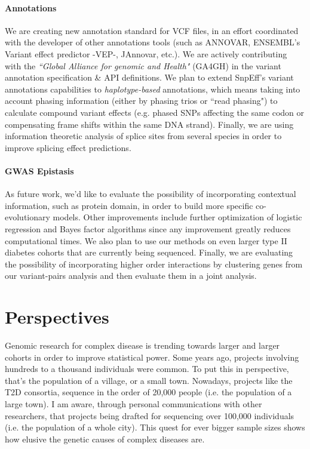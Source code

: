 \paragraph{Annotations}
We are creating new annotation standard for VCF files, in an effort coordinated with the developer of other annotations tools (such as ANNOVAR, ENSEMBL’s Variant effect predictor -VEP-, JAnnovar, etc.). We are actively contributing with the \textit{``Global Alliance for genomic and Health"} (GA4GH) in the variant annotation specification \& API definitions. 
We plan to extend SnpEff's variant annotations capabilities to \textit{haplotype-based} annotations, which means taking into account phasing information (either by phasing trios or ``read phasing") to calculate compound variant effects (e.g. phased SNPs affecting the same codon or compensating frame shifts within the same DNA strand).
Finally, we are using information theoretic analysis of splice sites from several species in order to improve splicing effect predictions.

\paragraph{GWAS Epistasis}
As future work, we'd like to evaluate the possibility of incorporating contextual information, such as protein domain, in order to build more specific co-evolutionary models. Other improvements include further optimization of logistic regression and Bayes factor algorithms since any improvement greatly reduces computational times. We also plan to use our methods on even larger type II diabetes cohorts that are currently being sequenced. Finally, we are evaluating the possibility of incorporating higher order interactions by clustering genes from our variant-pairs analysis and then evaluate them in a joint analysis.

\section{Perspectives}

Genomic research for complex disease is trending towards larger and larger cohorts in order to improve statistical power. Some years ago, projects involving hundreds to a thousand individuals were common. To put this in perspective, that’s the population of a village, or a small town. Nowadays, projects like the T2D consortia, sequence in the order of 20,000 people (i.e. the population of a large town). I am aware, through personal communications with other researchers, that projects being drafted for sequencing over 100,000 individuals (i.e. the population of a whole city). This quest for ever bigger sample sizes shows how elusive the genetic causes of complex diseases are. 

